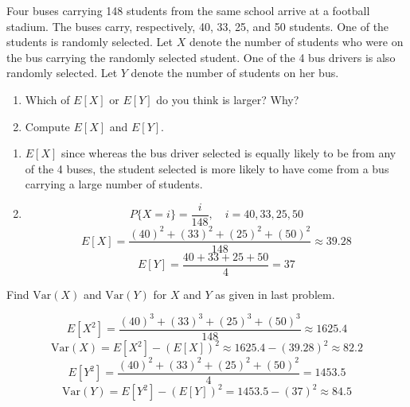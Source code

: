 \begin{exercise}
Four buses carrying 148 students from the same school arrive at a football stadium. The buses carry, respectively, 40, 33, 25, and 50 students. One of the students is randomly selected. Let \( X \) denote the number of students who were on the bus carrying the randomly selected student. One of the 4 bus drivers is also randomly selected. Let \( Y \) denote the number of students on her bus.

\begin{enumerate}[label=(\alph*)]
    \item Which of \( E[X] \) or \( E[Y] \) do you think is larger? Why?
    \item Compute \( E[X] \) and \( E[Y] \).
\end{enumerate}
\end{exercise}

\begin{solution}
\begin{enumerate}[label=(\alph*)]
    \item \( E[X] \) since whereas the bus driver selected is equally likely to be from any of the 4 buses, the student selected is more likely to have come from a bus carrying a large number of students.
    \item 
    \[
    P\{X = i\} = \frac{i}{148}, \quad i = 40, 33, 25, 50
    \]
    \[
    E[X] = \frac{(40)^2 + (33)^2 + (25)^2 + (50)^2}{148} \approx 39.28
    \]
    \[
    E[Y] = \frac{40 + 33 + 25 + 50}{4} = 37
    \]
\end{enumerate}
\end{solution}

\begin{exercise}
Find \( \text{Var}(X) \) and \( \text{Var}(Y) \) for \( X \) and \( Y \) as given in last problem.
\end{exercise}

\begin{solution}
\[
E[X^2] = \frac{(40)^3 + (33)^3 + (25)^3 + (50)^3}{148} \approx 1625.4
\]
\[
\text{Var}(X) = E[X^2] - (E[X])^2 \approx 1625.4 - (39.28)^2 \approx 82.2
\]
\[
E[Y^2] = \frac{(40)^2 + (33)^2 + (25)^2 + (50)^2}{4} = 1453.5
\]
\[
\text{Var}(Y) = E[Y^2] - (E[Y])^2 = 1453.5 - (37)^2 \approx 84.5
\]
\end{solution}


